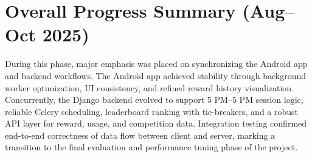 \documentclass[12pt]{article}
\begin{document}
    \section{Overall Progress Summary (Aug–Oct 2025)}
    During this phase, major emphasis was placed on synchronizing the Android app and backend workflows. The Android app achieved stability through background worker optimization, UI consistency, and refined reward history visualization. Concurrently, the Django backend evolved to support 5 PM–5 PM session logic, reliable Celery scheduling, leaderboard ranking with tie-breakers, and a robust API layer for reward, usage, and competition data. Integration testing confirmed end-to-end correctness of data flow between client and server, marking a transition to the final evaluation and performance tuning phase of the project.
    
\end{document}
